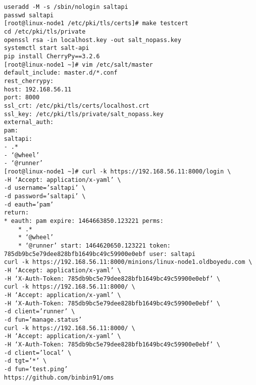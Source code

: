 \begin{lstlisting}
useradd -M -s /sbin/nologin saltapi
passwd saltapi
[root@linux-node1 /etc/pki/tls/certs]# make testcert
cd /etc/pki/tls/private
openssl rsa -in localhost.key -out salt_nopass.key
systemctl start salt-api
pip install CherryPy==3.2.6
[root@linux-node1 ~]# vim /etc/salt/master
default_include: master.d/*.conf
rest_cherrypy:
host: 192.168.56.11
port: 8000
ssl_crt: /etc/pki/tls/certs/localhost.crt
ssl_key: /etc/pki/tls/private/salt_nopass.key
external_auth:
pam:
saltapi:
- .*
- ‘@wheel’
- ‘@runner’
[root@linux-node1 ~]# curl -k https://192.168.56.11:8000/login \ 
-H ‘Accept: application/x-yaml’ \
-d username=’saltapi’ \
-d password=’saltapi’ \
-d eauth=’pam’
return:
* eauth: pam expire: 1464663850.123221 perms: 
    * .*
    * ‘@wheel’
    * ‘@runner’ start: 1464620650.123221 token: 785db9bc5e79dee828bfb1649bc49c59900e0ebf user: saltapi
curl -k https://192.168.56.11:8000/minions/linux-node1.oldboyedu.com \ 
-H ‘Accept: application/x-yaml’ \
-H ‘X-Auth-Token: 785db9bc5e79dee828bfb1649bc49c59900e0ebf’ \
curl -k https://192.168.56.11:8000/ \ 
-H ‘Accept: application/x-yaml’ \
-H ‘X-Auth-Token: 785db9bc5e79dee828bfb1649bc49c59900e0ebf’ \
-d client=’runner’ \
-d fun=’manage.status’
curl -k https://192.168.56.11:8000/ \ 
-H ‘Accept: application/x-yaml’ \
-H ‘X-Auth-Token: 785db9bc5e79dee828bfb1649bc49c59900e0ebf’ \
-d client=’local’ \
-d tgt=’*’ \
-d fun=’test.ping’
https://github.com/binbin91/oms
\end{lstlisting}

